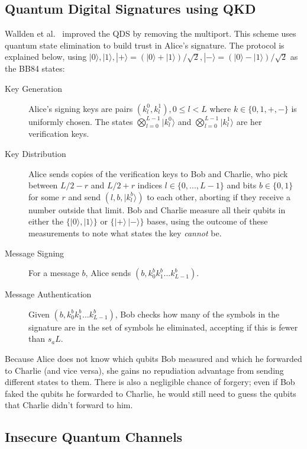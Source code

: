 \documentclass[%
 reprint,
 amsmath,amssymb,
 aps,
 pra,
]{revtex4-1}
\begin{document}
\subsection{Quantum Digital Signatures using QKD}
\label{ssec:qds-using-qkd}

Wallden et al.\ \cite{PhysRevA.91.042304} improved the QDS by removing the multiport. This scheme uses quantum state elimination \cite{PhysRevA.89.022336} to build trust in Alice's signature. The protocol is explained below, using $|0\rangle, |1\rangle, |+\rangle = (|0\rangle + |1\rangle)/\sqrt{2}, |-\rangle = (|0\rangle - |1\rangle)/\sqrt{2}$ as the BB84 \cite{BB84} states:

\begin{description}
\item[Key Generation]Alice's signing keys are pairs $(k^0_l, k^1_l), 0 \leq l < L$ where $k \in \{0, 1, +, -\}$ is uniformly chosen. The states $\bigotimes_{l=0}^{L-1}|k^0_l\rangle$ and $\bigotimes_{l=0}^{L-1}|k^1_l\rangle$ are her verification keys.
\item[Key Distribution]Alice sends copies of the verification keys to Bob and Charlie, who pick between $L/2-r$ and $L/2+r$ indices $l \in \{0,...,L-1\}$ and bits $b \in \{0, 1\}$ for some $r$ and send $(l, b, |k^b_l\rangle)$ to each other, aborting if they receive a number outside that limit. Bob and Charlie measure all their qubits in either the $\{|0\rangle, |1\rangle\}$ or $\{|+\rangle\, |-\rangle\}$ bases, using the outcome of these measurements to note what states the key \textit{cannot} be.
\item[Message Signing]For a message $b$, Alice sends $(b, k^b_0k^b_1...k^b_{L-1})$.
\item[Message Authentication]Given $(b, k^b_0k^b_1...k^b_{L-1})$, Bob checks how many of the symbols in the signature are in the set of symbols he eliminated, accepting if this is fewer than $s_aL$.
\end{description}

Because Alice does not know which qubits Bob measured and which he forwarded to Charlie (and vice versa), she gains no repudiation advantage from sending different states to them. There is also a negligible chance of forgery; even if Bob faked the qubits he forwarded to Charlie, he would still need to guess the qubits that Charlie didn't forward to him.

\subsection{Insecure Quantum Channels}
\label{ssec:insecure-qc}
\end{document}
